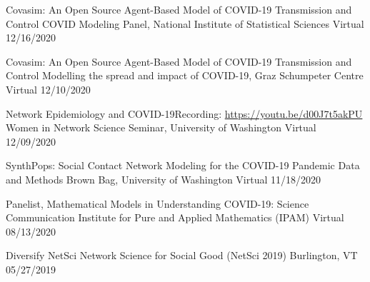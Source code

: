 
\begin{cventries}

  \cvpresentation
    {Covasim: An Open Source Agent-Based Model of COVID-19 Transmission and Control} %
    {COVID Modeling Panel, National Institute of Statistical Sciences} %
    {Virtual} %
    {12/16/2020} %


  \cvpresentation
    {Covasim: An Open Source Agent-Based Model of COVID-19 Transmission and Control} %
    {Modelling the spread and impact of COVID-19, Graz Schumpeter Centre} %
    {Virtual} %
    {12/10/2020} %

  \cvpresentation
    {Network Epidemiology and COVID-19\newline Recording: \href{https://youtu.be/d00J7t5akPU}{https://youtu.be/d00J7t5akPU \faLink\acvHeaderIconSep}} %
    {Women in Network Science Seminar, University of Washington} %
    {Virtual} %
    {12/09/2020} %
    \vspace{2mm}

  \cvpresentation
    {SynthPops: Social Contact Network Modeling for the COVID-19 Pandemic} %
    {Data and Methods Brown Bag, University of Washington} %
    {Virtual} %
    {11/18/2020} %


  \cvpresentation
    {Panelist, Mathematical Models in Understanding COVID-19: Science Communication} %
    {Institute for Pure and Applied Mathematics (IPAM)} %
    {Virtual} %
    {08/13/2020} %

  \cvpresentation
    {Diversify NetSci} %
    {Network Science for Social Good (NetSci 2019)} %
    {Burlington, VT} %
    {05/27/2019} %


\end{cventries}
